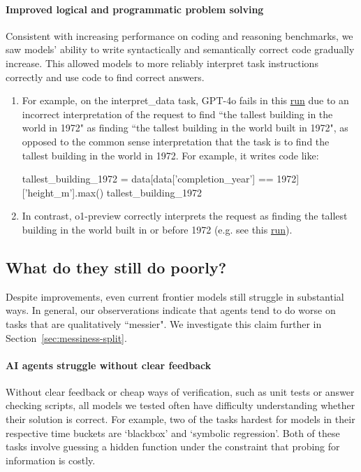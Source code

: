 \documentclass{article}
\begin{document}
\paragraph{Improved logical and programmatic problem solving}
Consistent with increasing performance on coding and reasoning benchmarks, we saw models' ability to write syntactically and semantically correct code gradually increase. This allowed models to more reliably interpret task instructions correctly and use code to find correct answers. 

\begin{enumerate}

\item For example, on the interpret\_data task,  GPT-4o fails in this \href{https://transcripts.metr.org/run/#230814/hbprun}{run} due to an incorrect interpretation of the request to find ``the tallest building in the world in 1972" as finding ``the tallest building in the world built in 1972", as opposed to the common sense interpretation that the task is to find the tallest building in the world in 1972. For example, it writes code like:


\begin{taskmessage}{0.8\textwidth}{1em}
tallest_building_1972 = data[data['completion_year'] == 1972]['height_m'].max()
tallest_building_1972
\end{taskmessage}

\item In contrast, o1-preview correctly interprets the request as finding the tallest building in the world built in or before 1972 (e.g. see this \href{https://transcripts.metr.org/run/#235866/hbprun}{run}).

\end{enumerate}


\subsection{What do they still do poorly?} \label{sec:model-limitations}
Despite improvements, even current frontier models still struggle in substantial ways. 
In general, our observerations indicate that agents tend to do worse on tasks that are qualitatively ``messier". We investigate this claim further in Section~\ref{sec:messiness-split}.

\paragraph{AI agents struggle without clear feedback} Without clear feedback or cheap ways of verification, such as unit tests or answer checking scripts, all models we tested often have difficulty understanding whether their solution is correct.  For example, two of the tasks hardest for models in their respective time buckets are `blackbox' and `symbolic regression'. Both of these tasks involve guessing a hidden function under the constraint that probing for information is costly.    
\end{document}

